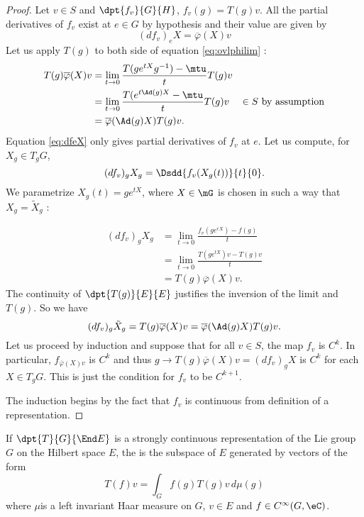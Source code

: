\begin{proof}
Let $v\in S$ and $\dpt{ f_v }{ G }{ H }$, $f_v(g)=T(g)v$. All the partial derivatives of $f_v$ exist at $e\in G$ by hypothesis and their value are given by
\begin{equation} \label{eq:dfeX}
  (df_v)_eX=\overline{ \varphi }(X)v 
\end{equation}
Let us apply $T(g)$ to both side of equation \eqref{eq:ovlphilim} :
\begin{equation}
\begin{aligned}
   T(g)\overline{ \varphi }(X)v&=\lim_{t\to 0}\frac{ T(ge^{tX}g^{-1})-\mtu }{ t }T(g)v\\
				&=\lim_{t\to 0}\frac{ T(e^{t\Ad(g)X}-\mtu }{ t }T(g)v&\in S\textrm{ by assumption}\\
				&=\overline{ \varphi }(\Ad(g)X)T(g)v.
\end{aligned}
\end{equation}
Equation \eqref{eq:dfeX} only gives partial derivatives of $f_v$ at $e$. Let us compute, for $X_g\in T_gG$,
\[ 
  (df_v)_gX_g=\Dsdd{ f_v(X_g(t)) }{t}{0}.
\]
We parametrize $X_g(t)=ge^{tX}$, where $X\in\mG$ is chosen in such a way that $X_g= \tilde X_g$ :

 \begin{equation}
\begin{split}
  (df_v)_gX_g&=\lim_{t\to0}\frac{ f_v(ge^{rX})-f(g) }{ t }\\
		&=\lim_{t\to 0}\frac{ T(ge^{tX})v-T(g)v }{ t }\\
		&=T(g)\overline{ \varphi }(X)v.
\end{split}
\end{equation}
The continuity of $\dpt{ T(g) }{ E }{ E }$ justifies the inversion of the limit and $T(g)$. So we have
\[ 
  (df_v)_g\tilde X_g=T(g)\overline{ \varphi }(X)v=\overline{ \varphi }(\Ad(g)X)T(g)v.
\]
Let us proceed by induction and suppose that for all $v\in S$, the map $f_v$ is $C^k$. In particular, $f_{\overline{ \varphi }(X)v}$ is $C^k$ and thus $g\to T(g)\overline{ \varphi }(X)v=(df_v)_gX$ is $C^k$ for each $X\in T_gG$. This is just the condition for $f_v$ to be $C^{k+1}$.

The induction begins by the fact that $f_v$ is continuous from definition of a representation.

\end{proof}

\begin{definition}

If $\dpt{ T }{ G }{ \End E }$ is a strongly continuous representation of the Lie group $G$ on the Hilbert space $E$, the  is the subspace of $E$ generated by vectors of the form
\begin{equation}
  T(f)v=\int_Gf(g)T(g)v\,d\mu(g)
\end{equation}
where $\mu$is a left invariant Haar measure on $G$, $v\in E$ and $f\in C^{\infty}(G,\eC)$.

\end{definition}

